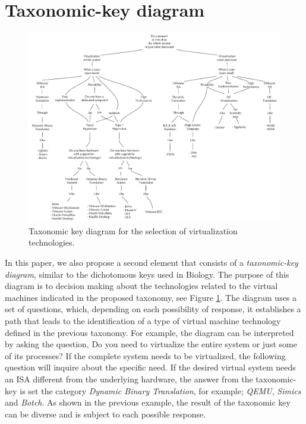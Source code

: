 \section {Taxonomic-key diagram}           \label{sec:choosingVirtualizationTechnology}
	\begin{figure}[ht] %
		\centering
		\includegraphics[width=18cm]{images/taxonomic-KeyDiagramV2.pdf}
		\vspace{-0.2cm}
		\caption{Taxonomic key diagram for the selection of virtualization technologies.}
		\label{fig:taxonomic-keyDiagram}
	\end{figure}
	
	In this paper, we also propose a second element that consists of a \textit{taxonomic-key diagram}, similar to the dichotomous keys used in Biology. The purpose of this diagram is to decision making about the technologies related to the virtual machines indicated in the proposed taxonomy, see Figure \ref{fig:taxonomic-keyDiagram}. The diagram uses a set of questions, which, depending on each possibility of response, it establishes a path that leads to the identification of a type of virtual machine technology defined in the previous taxonomy. For example, the diagram can be interpreted by asking the question, Do you need to virtualize the entire system or just some of its processes? If the complete system needs to be virtualized, the following question will inquire about the specific need. If the desired virtual system needs an ISA different from the underlying hardware, the answer from the taxonomic-key is set the category \textit {Dynamic Binary Translation}, for example; \textit{QEMU}, \textit{Simics} and \textit{Botch}. As shown in the previous example, the result of the taxonomic key can be diverse and is subject to each possible response.
